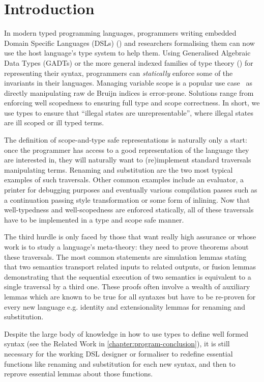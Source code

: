 \chapter{Introduction}

In modern typed programming languages, programmers writing embedded Domain Specific
Languages (DSLs) (\cite{hudak1996building}) and researchers formalising them can
now use the host language's type system to help them. Using Generalised Algebraic
Data Types (GADTs) or the more general indexed families of type theory
(\cite{dybjer1994inductive}) for representing their syntax, programmers can
\emph{statically} enforce some of the invariants in their languages. Managing
variable scope is a popular use case~\cite{altenkirch1999monadic} as directly
manipulating raw de Bruijn indices is error-prone. Solutions range from enforcing
well scopedness to ensuring full type and scope correctness. In short, we use
types to ensure that ``illegal states are unrepresentable'', where illegal states
are ill scoped or ill typed terms.

The definition of scope-and-type safe representations is naturally only a start:
once the programmer has access to a good representation of the language they are
interested in, they will naturally want to (re)implement standard traversals
manipulating terms. Renaming and substitution are the two most typical examples
of such traversals. Other common examples include an evaluator, a printer for
debugging purposes and eventually various compilation passes such as a continuation
passing style transformation or some form of inlining. Now that well-typedness
and well-scopedness are enforced statically, all of these traversals have to be
implemented in a type and scope safe manner.

The third hurdle is only faced by those that want really high assurance or whose
work is to study a language's meta-theory: they need to prove theorems about these
traversals. The most common statements are simulation lemmas stating that two
semantics transport related inputs to related outputs, or fusion lemmas demonstrating
that the sequential execution of two semantics is equivalent to a single traversal
by a third one. These proofs often involve a wealth of auxiliary lemmas which are
known to be true for all syntaxes but have to be re-proven for every new language
e.g. identity and extensionality lemmas for renaming and substitution.

Despite the large body of knowledge in how to use types to define well formed
syntax (see the Related Work in \cref{chapter:program-conclusion}), it is still
necessary for the working DSL designer or formaliser to redefine essential
functions like renaming and substitution for each new syntax, and then to
reprove essential lemmas about those functions.

